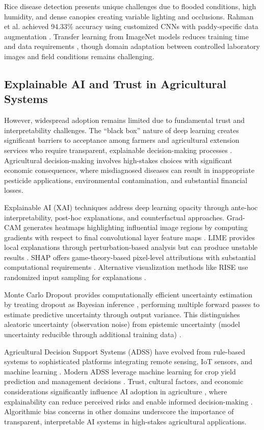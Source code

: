 \documentclass[agriculture,article,submit,pdftex,moreauthors]{Definitions/mdpi}
\begin{document}
Rice disease detection presents unique challenges due to flooded conditions, high humidity, and dense canopies creating variable lighting and occlusions. Rahman et al. achieved 94.33\% accuracy using customized CNNs with paddy-specific data augmentation \cite{rahman2020deep}. Transfer learning from ImageNet models reduces training time and data requirements \cite{lu2017identification}, though domain adaptation between controlled laboratory images and field conditions remains challenging.

\subsection{Explainable AI and Trust in Agricultural Systems}

However, widespread adoption remains limited due to fundamental trust and interpretability challenges. The ``black box'' nature of deep learning creates significant barriers to acceptance among farmers and agricultural extension services who require transparent, explainable decision-making processes \cite{wolfert2017big}. Agricultural decision-making involves high-stakes choices with significant economic consequences, where misdiagnosed diseases can result in inappropriate pesticide applications, environmental contamination, and substantial financial losses.

Explainable AI (XAI) techniques address deep learning opacity through ante-hoc interpretability, post-hoc explanations, and counterfactual approaches. Grad-CAM generates heatmaps highlighting influential image regions by computing gradients with respect to final convolutional layer feature maps \cite{selvaraju2017grad}. LIME provides local explanations through perturbation-based analysis but can produce unstable results \cite{ribeiro2016should}. SHAP offers game-theory-based pixel-level attributions with substantial computational requirements \cite{lundberg2017unified}. Alternative visualization methods like RISE use randomized input sampling for explanations \cite{petsiuk2018rise}.

Monte Carlo Dropout provides computationally efficient uncertainty estimation by treating dropout as Bayesian inference \cite{gal2016dropout}, performing multiple forward passes to estimate predictive uncertainty through output variance. This distinguishes aleatoric uncertainty (observation noise) from epistemic uncertainty (model uncertainty reducible through additional training data) \cite{kendall2017uncertainties}.

Agricultural Decision Support Systems (ADSS) have evolved from rule-based systems to sophisticated platforms integrating remote sensing, IoT sensors, and machine learning \cite{jones2003dssat,keating2003overview}. Modern ADSS leverage machine learning for crop yield prediction and management decisions \cite{zhang2019crop}. Trust, cultural factors, and economic considerations significantly influence AI adoption in agriculture \cite{lee2004trust,wright2022adoption}, where explainability can reduce perceived risks and enable informed decision-making \cite{german2021co}. Algorithmic bias concerns in other domains \cite{obermeyer2019dissecting} underscore the importance of transparent, interpretable AI systems in high-stakes agricultural applications.
\end{document}
